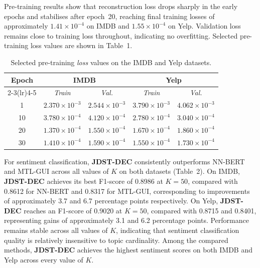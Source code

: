 {Pre-training results show that reconstruction loss drops sharply in the
early epochs and stabilises after epoch~20, reaching final training losses
of approximately $1{.}41 \times 10^{-4}$ on IMDB and $1{.}55 \times 10^{-4}$
on Yelp. Validation loss remains close to training loss throughout, indicating
no overfitting. Selected pre-training loss values are shown in Table~1.

\begin{table}[H]
    \centering
    \caption{Selected pre-training \textit{loss} values on the IMDB and
    Yelp datasets.}
    \label{tab:ea_pretrain}
    \renewcommand{\arraystretch}{1.15}
    \begin{tabular}{ccccc}
        \toprule
        \multirow{2}{*}{\textbf{Epoch}}
          & \multicolumn{2}{c}{\textbf{IMDB}}
          & \multicolumn{2}{c}{\textbf{Yelp}} \\
        \cmidrule(lr){2-3}\cmidrule(lr){4-5}
          & \textit{Train} & \textit{Val.}
          & \textit{Train} & \textit{Val.} \\
        \midrule
         1  & $2{.}370 \times 10^{-3}$ & $2{.}544 \times 10^{-3}$
            & $3{.}790 \times 10^{-3}$ & $4{.}062 \times 10^{-3}$ \\
        10  & $3{.}780 \times 10^{-4}$ & $4{.}120 \times 10^{-4}$
            & $2{.}780 \times 10^{-4}$ & $3{.}040 \times 10^{-4}$ \\
        20  & $1{.}370 \times 10^{-4}$ & $1{.}550 \times 10^{-4}$
            & $1{.}670 \times 10^{-4}$ & $1{.}860 \times 10^{-4}$ \\
        30  & $1{.}410 \times 10^{-4}$ & $1{.}590 \times 10^{-4}$
            & $1{.}550 \times 10^{-4}$ & $1{.}730 \times 10^{-4}$ \\
        \bottomrule
    \end{tabular}
\end{table}

For sentiment classification, \textbf{JDST-DEC} consistently outperforms
NN-BERT and MTL-GUI across all values of $K$ on both datasets (Table~2).
On IMDB, \textbf{JDST-DEC} achieves its best F1-score of 0.8986 at $K = 50$,
compared with 0.8612 for NN-BERT and 0.8317 for MTL-GUI, corresponding to
improvements of approximately 3.7 and 6.7 percentage points respectively.
On Yelp, \textbf{JDST-DEC} reaches an F1-score of 0.9020 at $K = 50$,
compared with 0.8715 and 0.8401, representing gains of approximately 3.1 and
6.2 percentage points. Performance remains stable across all values of $K$,
indicating that sentiment classification quality is relatively insensitive
to topic cardinality. Among the compared methods, \textbf{JDST-DEC} achieves
the highest sentiment scores on both IMDB and Yelp across every value of
$K$.

}
